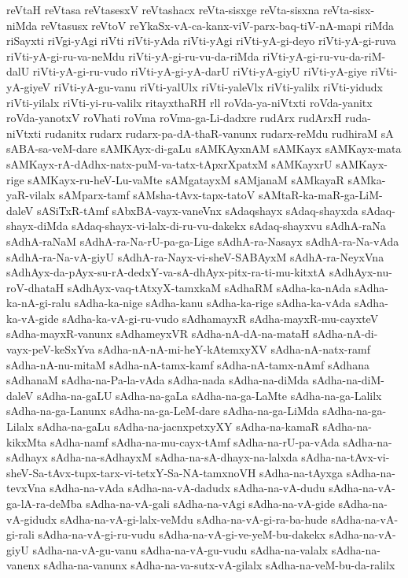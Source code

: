 {reVtaH
reVtasa
reVtasesxV
reVtashacx
reVta-sisxge
reVta-sisxna
reVta-sisx-niMda
reVtasusx
reVtoV
reYkaSx-vA-ca-kanx-viV-parx-baq-tiV-nA-mapi
riMda
riSayxti
riVgi-yAgi
riVti
riVti-yAda
riVti-yAgi
riVti-yA-gi-deyo
riVti-yA-gi-ruva
riVti-yA-gi-ru-va-neMdu
riVti-yA-gi-ru-vu-da-riMda
riVti-yA-gi-ru-vu-da-riM-dalU
riVti-yA-gi-ru-vudo
riVti-yA-gi-yA-darU
riVti-yA-giyU
riVti-yA-giye
riVti-yA-giyeV
riVti-yA-gu-vanu
riVti-yalUlx
riVti-yaleVlx
riVti-yalilx
riVti-yidudx
riVti-yilalx
riVti-yi-ru-valilx
ritayxthaRH
rll
roVda-ya-niVtxti
roVda-yanitx
roVda-yanotxV
roVhati
roVma
roVma-ga-Li-dadxre
rudArx
rudArxH
ruda-niVtxti
rudanitx
rudarx
rudarx-pa-dA-thaR-vanunx
rudarx-reMdu
rudhiraM
sA
sABA-sa-veM-dare
sAMKAyx-di-gaLu
sAMKAyxnAM
sAMKayx
sAMKayx-mata
sAMKayx-rA-dAdhx-natx-puM-va-tatx-tApxrXpatxM
sAMKayxrU
sAMKayx-rige
sAMKayx-ru-heV-Lu-vaMte
sAMgatayxM
sAMjanaM
sAMkayaR
sAMka-yaR-vilalx
sAMparx-tamf
sAMsha-tAvx-tapx-tatoV
sAMtaR-ka-maR-ga-LiM-daleV
sASiTxR-tAmf
sAbxBA-vayx-vaneVnx
sAdaqshayx
sAdaq-shayxda
sAdaq-shayx-diMda
sAdaq-shayx-vi-lalx-di-ru-vu-dakekx
sAdaq-shayxvu
sAdhA-raNa
sAdhA-raNaM
sAdhA-ra-Na-rU-pa-ga-Lige
sAdhA-ra-Nasayx
sAdhA-ra-Na-vAda
sAdhA-ra-Na-vA-giyU
sAdhA-ra-Nayx-vi-sheV-SABAyxM
sAdhA-ra-NeyxVna
sAdhAyx-da-pAyx-su-rA-dedxY-va-sA-dhAyx-pitx-ra-ti-mu-kitxtA
sAdhAyx-nu-roV-dhataH
sAdhAyx-vaq-tAtxyX-tamxkaM
sAdhaRM
sAdha-ka-nAda
sAdha-ka-nA-gi-ralu
sAdha-ka-nige
sAdha-kanu
sAdha-ka-rige
sAdha-ka-vAda
sAdha-ka-vA-gide
sAdha-ka-vA-gi-ru-vudo
sAdhamayxR
sAdha-mayxR-mu-cayxteV
sAdha-mayxR-vanunx
sAdhameyxVR
sAdha-nA-dA-na-mataH
sAdha-nA-di-vayx-peV-keSxYva
sAdha-nA-nA-mi-heY-kAtemxyXV
sAdha-nA-natx-ramf
sAdha-nA-nu-mitaM
sAdha-nA-tamx-kamf
sAdha-nA-tamx-nAmf
sAdhana
sAdhanaM
sAdha-na-Pa-la-vAda
sAdha-nada
sAdha-na-diMda
sAdha-na-diM-daleV
sAdha-na-gaLU
sAdha-na-gaLa
sAdha-na-ga-LaMte
sAdha-na-ga-Lalilx
sAdha-na-ga-Lanunx
sAdha-na-ga-LeM-dare
sAdha-na-ga-LiMda
sAdha-na-ga-Lilalx
sAdha-na-gaLu
sAdha-na-jacnxpetxyXY
sAdha-na-kamaR
sAdha-na-kikxMta
sAdha-namf
sAdha-na-mu-cayx-tAmf
sAdha-na-rU-pa-vAda
sAdha-na-sAdhayx
sAdha-na-sAdhayxM
sAdha-na-sA-dhayx-na-lalxda
sAdha-na-tAvx-vi-sheV-Sa-tAvx-tupx-tarx-vi-tetxY-Sa-NA-tamxnoVH
sAdha-na-tAyxga
sAdha-na-tevxVna
sAdha-na-vAda
sAdha-na-vA-dadudx
sAdha-na-vA-dudu
sAdha-na-vA-ga-lA-ra-deMba
sAdha-na-vA-gali
sAdha-na-vAgi
sAdha-na-vA-gide
sAdha-na-vA-gidudx
sAdha-na-vA-gi-lalx-veMdu
sAdha-na-vA-gi-ra-ba-hude
sAdha-na-vA-gi-rali
sAdha-na-vA-gi-ru-vudu
sAdha-na-vA-gi-ve-yeM-bu-dakekx
sAdha-na-vA-giyU
sAdha-na-vA-gu-vanu
sAdha-na-vA-gu-vudu
sAdha-na-valalx
sAdha-na-vanenx
sAdha-na-vanunx
sAdha-na-va-sutx-vA-gilalx
sAdha-na-veM-bu-da-ralilx
}
